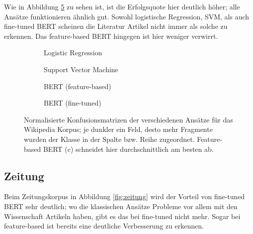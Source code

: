 Wie in Abbildung \ref{fig:wikipedia} zu sehen ist, ist die Erfolgsquote hier deutlich höher; alle Ansätze funktionieren ähnlich gut. Sowohl logistische Regression, SVM, als auch fine-tuned BERT scheinen die Literatur Artikel nicht immer als solche zu erkennen. Das feature-based BERT hingegen ist hier weniger verwirrt.

\begin{figure}
\centering
\begin{subfigure}[b]{.45\linewidth}

\caption{Logistic Regression}\label{fig:wikipedia-log}
\end{subfigure}
\begin{subfigure}[b]{.45\linewidth}

\caption{Support Vector Machine}\label{fig:wikipedia-svm}
\end{subfigure}

\begin{subfigure}[b]{.45\linewidth}

\caption{BERT (feature-based)}\label{fig:wikipedia-feat}
\end{subfigure}
\begin{subfigure}[b]{.45\linewidth}

\caption{BERT (fine-tuned)}\label{fig:wikipedia-fine}
\end{subfigure}
\caption{Normalisierte Konfusionsmatrizen der verschiedenen Ansätze für das Wikipedia Korpus; je dunkler ein Feld, desto mehr Fragmente wurden der Klasse in der Spalte bzw. Reihe zugeordnet. Feature-based BERT (c) schneidet hier durchschnittlich am besten ab.}
\label{fig:wikipedia}
\end{figure}





\subsection{Zeitung}
\label{zeitung_diskussion}

Beim Zeitungskorpus in Abbildung \ref{fig:zeitung} wird der Vorteil von fine-tuned BERT sehr deutlich; wo die klassischen Ansätze Probleme vor allem mit den Wissenschaft Artikeln haben, gibt es das bei fine-tuned nicht mehr. Sogar bei feature-based ist bereits eine deutliche Verbesserung zu erkennen.

